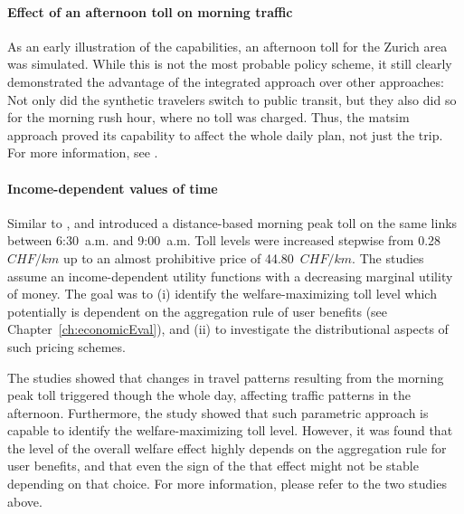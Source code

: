 \paragraph{Effect of an afternoon toll on morning traffic}

As an early illustration of the capabilities, an afternoon toll for the Zurich area was simulated.  While this is not the most probable policy scheme, it still clearly demonstrated the advantage of the integrated approach over other approaches: Not only did the synthetic travelers switch to public transit, but they also did so for the morning rush hour, where no toll was charged.  Thus, the \acrshort{matsim} approach proved its capability to affect the whole daily plan, not just the trip.  For more information, see \cite{RieserEtAl_TRBTDF_2008}.




\paragraph{Income-dependent values of time}

Similar to \cite{RieserEtAl_TRBTDF_2008}, \cite{KickhoeferEtAl2010EconomicEvaluationPublicAcceptanceRoadPricingKuhmo} and \cite{Kickhoefer_PhDThesis_2014} introduced a distance-based morning peak toll on the same links between 6:30~a.m. and 9:00~a.m. Toll levels were increased stepwise from 0.28~$CHF/km$ up to an almost prohibitive price of 44.80~$CHF/km$. The studies assume an income-dependent utility functions with a decreasing marginal utility of money. The goal was to (i) identify the welfare-maximizing toll level which potentially is dependent on the aggregation rule of user benefits (see Chapter~\ref{ch:economicEval}), and (ii) to investigate the distributional aspects of such pricing schemes.

The studies showed that changes in travel patterns resulting from the morning peak toll triggered though the whole day, affecting traffic patterns in the afternoon.
%
Furthermore, the study showed that such parametric approach is capable to identify the welfare-maximizing toll level. However, it was found that the level of the overall welfare effect highly depends on the aggregation rule for user benefits, and that even the sign of the that effect might not be stable depending on that choice.
%
For more information, please refer to the two studies above.

